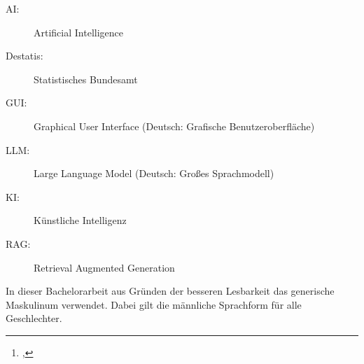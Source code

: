 \documentclass[12pt,toc=bib,toc=listof]{scrreprt}
\title{\reprttopic}
\author{\reprtstudentname\footnote{\reprtstudentid, \reprtstudentmail}}
\begin{document}
\maketitle
{}

\tableofcontents

\label{sec:abkuerzungsverzeichnis}

\begin{description}
  \item[AI:] Artificial Intelligence
  \item[Destatis:] Statistisches Bundesamt
  \item[GUI:] Graphical User Interface (Deutsch: Grafische Benutzeroberfläche)
  \item[LLM:] Large Language Model (Deutsch: Großes Sprachmodell)
  \item[KI:] Künstliche Intelligenz
  \item[RAG:] Retrieval Augmented Generation
\end{description}

\newpage
\listoffigures
\newpage
{} %
\label{sec:gender_hinweis}
In dieser Bachelorarbeit aus Gründen der besseren Lesbarkeit das generische Maskulinum verwendet. Dabei gilt die männliche Sprachform für alle Geschlechter.
\end{document}
